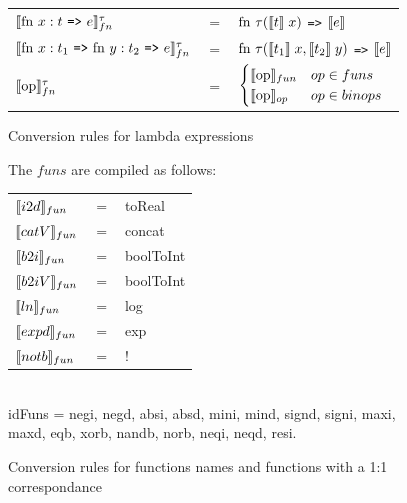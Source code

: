 \documentclass[11pt]{article}
\begin{document}
\begin{figure}
\label{fig:lambdas}
\begin{tabular}{l c l}
$\evals{ \text{fn } x:t $ {\tt =>} $ e}^{\tau}_{fn} $ & $=$ & $ \text{fn } \tau (\llbracket t \rrbracket\; x) $ {\tt =>} $ \llbracket e \rrbracket$\\
$\evals{ \text{fn } x:t_1$ {\tt =>} $\text{fn } y:t_2 $ {\tt =>} $ e}^{\tau}_{fn} $ & $=$ & $ \text{fn } \tau (\llbracket t_1 \rrbracket\; x, \llbracket t_2 \rrbracket \; y) $ {\tt =>} $ \llbracket e \rrbracket$\\
$\llbracket \text{op} \rrbracket^{\tau}_{fn}$ & = & $ \begin{cases} \llbracket \text{op} \rrbracket_{fun} & op \in funs \\ \llbracket \text{op} \rrbracket_{op} & op \in binops \end{cases}$
\end{tabular}
    \caption{Conversion rules for lambda expressions}
\end{figure}



\begin{figure}
\label{fig:funs}
The $funs$ are compiled as follows:\\
\begin{tabular}{l c l}
$\llbracket i2d \rrbracket_{fun}$ & $=$ & toReal\\ 
$\llbracket catV \rrbracket_{fun}$ & $=$ & concat\\ 
$\llbracket b2i \rrbracket_{fun}$ & $=$ & boolToInt\\ 
$\llbracket b2iV \rrbracket_{fun}$ & $=$ & boolToInt\\ 
$\llbracket ln \rrbracket_{fun}$ & $=$ & log\\ 
$\llbracket expd \rrbracket_{fun}$ & $=$ & exp\\ 
$\llbracket notb \rrbracket_{fun}$ & $=$ & !\\ 
\end{tabular}\\


idFuns = negi, negd, absi, absd, mini, mind, signd, signi, maxi, maxd, eqb, xorb, nandb, norb, neqi, neqd, resi.
\caption{Conversion rules for functions names and functions with a 1:1 correspondance}
\end{figure}
\end{document}
